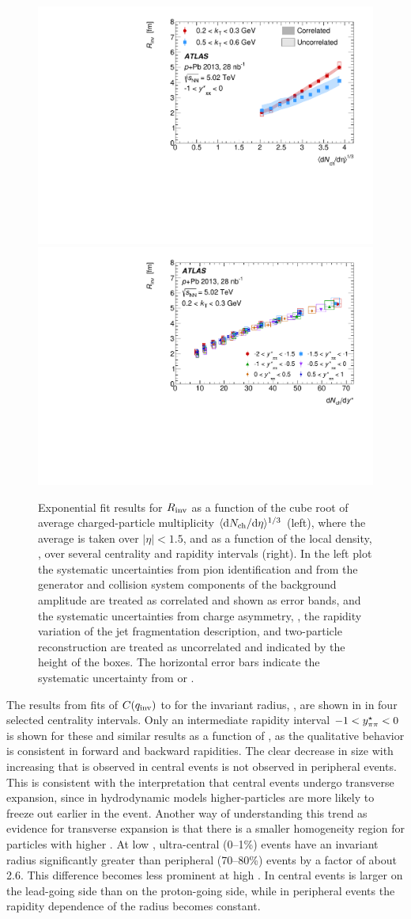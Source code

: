 \begin{figure}[t]
\centering
\includegraphics[width=0.49\linewidth]{canqinv_R_vs_avg_mult.pdf}
\includegraphics[width=0.49\linewidth]{canqinv_R_kt1_vs_mult.pdf}
\caption{Exponential fit results for $R_{\mathrm{inv}}$ as a function of the cube root of average charged-particle multiplicity $\langle\mathrm{d}\mbox{$N_{\mathrm{ch}}$}/\mathrm{d}\eta\rangle^{1/3}$ (left), where the average is taken over $|\eta| < 1.5$, and as a function of the local density, \dNdy, over several centrality and rapidity intervals (right). In the left plot the systematic uncertainties from pion identification and from the generator and collision system components of the background amplitude are treated as correlated and shown as error bands, and the systematic uncertainties from charge asymmetry, \Reff, the rapidity variation of the jet fragmentation description, and two-particle reconstruction are treated as uncorrelated and indicated by the height of the boxes. The horizontal error bars indicate the systematic uncertainty from \avgdNdeta or \dNdy.}
\label{fig:results_Rinv_dndeta}
\end{figure}

The results from fits of $C(q_{\mathrm{inv}})$ to  for the invariant radius, \Rinv, are shown in  in four selected centrality intervals.
Only an intermediate rapidity interval $-1 < y^{\star}_{\pi\pi} < 0$ is shown for these and similar results as a function of \kt, as the qualitative behavior is consistent in forward and backward rapidities.
The clear decrease in size with increasing \kt that is observed in central events is not observed in peripheral events.
This is consistent with the interpretation that central events undergo transverse expansion, since in hydrodynamic models higher-\pt particles are more likely to freeze out earlier in the event.
Another way of understanding this trend as evidence for transverse expansion is that there is a smaller homogeneity region for particles with higher \pt \cite{Kolb:2003dz}.
At low \kt, ultra-central (0--1\%) events have an invariant radius significantly greater than peripheral (70--80\%) events by a factor of about 2.6.
This difference becomes less prominent at high \kt.
In central events \Rinv is larger on the lead-going side than on the proton-going side, while in peripheral events the rapidity dependence of the radius becomes constant.

